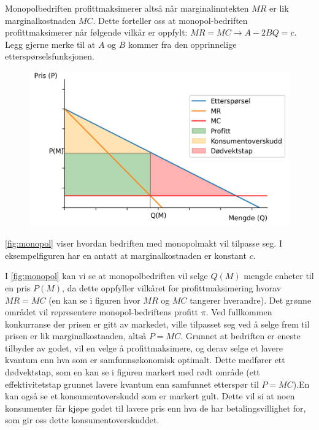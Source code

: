 \documentclass[
  12pt,
  a4paper,
  DIV=11,
  numbers=noendperiod]{scrartcl}
\begin{document}
Monopolbedriften profittmaksimerer altså når marginalinntekten \(MR\) er
lik marginalkostnaden \(MC\). Dette forteller oss at monopol-bedriften
profittmaksimerer når følgende vilkår er oppfylt:
\(MR = MC \rightarrow A-2BQ = c\). Legg gjerne merke til at \(A\) og
\(B\) kommer fra den opprinnelige etterspørselsfunksjonen.

\begin{figure}[h!]
\centering
  \includegraphics[width=\linewidth]{dokumentobjekter/figurer/monopol.png}
  \label{fig:monopol}
\end{figure}

\autoref{fig:monopol} viser hvordan bedriften med monopolmakt vil
tilpasse seg. I eksempelfiguren har en antatt at marginalkostnaden er
konstant \(c\).

I \autoref{fig:monopol} kan vi se at monopolbedriften vil selge \(Q(M)\)
mengde enheter til en pris \(P(M)\), da dette oppfyller vilkåret for
profittmaksimering hvorav \(MR = MC\) (en kan se i figuren hvor \(MR\)
og \(MC\) tangerer hverandre). Det grønne området vil representere
monopol-bedriftens profitt \(\pi\). Ved fullkommen konkurranse der
prisen er gitt av markedet, ville tilpasset seg ved å selge frem til
prisen er lik marginalkostnaden, altså \(P = MC\). Grunnet at bedriften
er eneste tilbyder av godet, vil en velge å profittmaksimere, og derav
selge et lavere kvantum enn hva som er samfunnsøkonomisk optimalt. Dette
medfører ett dødvektstap, som en kan se i figuren markert med rødt
område (ett effektivitetstap grunnet lavere kvantum enn samfunnet
etterspør til \(P=MC\)).En kan også se et konsumentoverskudd som er
markert gult. Dette vil si at noen konsumenter får kjøpe godet til
lavere pris enn hva de har betalingsvillighet for, som gir oss dette
konsumentoverskuddet.
\end{document}
